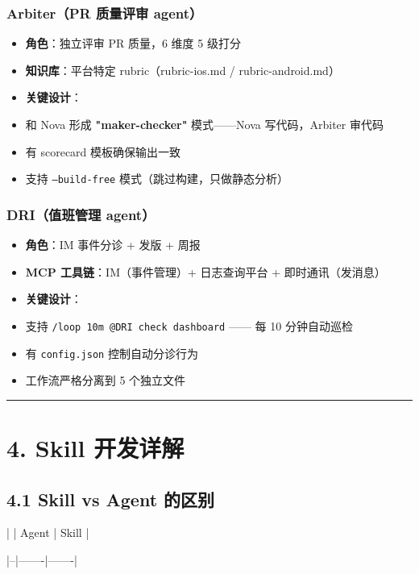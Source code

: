 \subsubsection{Arbiter（PR 质量评审 agent）}

\begin{itemize}[leftmargin=2em]
\item \textbf{角色}：独立评审 PR 质量，6 维度 5 级打分
\item \textbf{知识库}：平台特定 rubric（rubric-ios.md / rubric-android.md）
\item \textbf{关键设计}：
\item 和 Nova 形成 \textbf{"maker-checker"} 模式------Nova 写代码，Arbiter 审代码
\item 有 scorecard 模板确保输出一致
\item 支持 \texttt{--build-free} 模式（跳过构建，只做静态分析）
\end{itemize}

\subsubsection{DRI（值班管理 agent）}

\begin{itemize}[leftmargin=2em]
\item \textbf{角色}：IM 事件分诊 + 发版 + 周报
\item \textbf{MCP 工具链}：IM（事件管理）+ 日志查询平台 + 即时通讯（发消息）
\item \textbf{关键设计}：
\item 支持 \texttt{/loop 10m @DRI check dashboard} ------ 每 10 分钟自动巡检
\item 有 \texttt{config.json} 控制自动分诊行为
\item 工作流严格分离到 5 个独立文件
\end{itemize}

\bigskip\hrule\bigskip

\section{4. Skill 开发详解}

\subsection{4.1 Skill vs Agent 的区别}

| | Agent | Skill |

|--|-------|-------|

